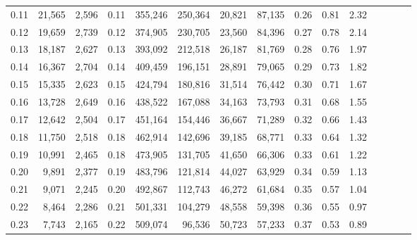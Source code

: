 \begin{tabular}{rrrcrrrrrrrrrrr}
0.11 &  21,565 &  2,596 &                                       0.11 &  355,246 &  250,364 &   20,821 &   87,135 &  0.26 &  0.81 &                         2.32 \\
0.12 &  19,659 &  2,739 &                                       0.12 &  374,905 &  230,705 &   23,560 &   84,396 &  0.27 &  0.78 &                         2.14 \\
0.13 &  18,187 &  2,627 &                                       0.13 &  393,092 &  212,518 &   26,187 &   81,769 &  0.28 &  0.76 &                         1.97 \\
0.14 &  16,367 &  2,704 &                                       0.14 &  409,459 &  196,151 &   28,891 &   79,065 &  0.29 &  0.73 &                         1.82 \\
0.15 &  15,335 &  2,623 &                                       0.15 &  424,794 &  180,816 &   31,514 &   76,442 &  0.30 &  0.71 &                         1.67 \\
0.16 &  13,728 &  2,649 &                                       0.16 &  438,522 &  167,088 &   34,163 &   73,793 &  0.31 &  0.68 &                         1.55 \\
0.17 &  12,642 &  2,504 &                                       0.17 &  451,164 &  154,446 &   36,667 &   71,289 &  0.32 &  0.66 &                         1.43 \\
0.18 &  11,750 &  2,518 &                                       0.18 &  462,914 &  142,696 &   39,185 &   68,771 &  0.33 &  0.64 &                         1.32 \\
0.19 &  10,991 &  2,465 &                                       0.18 &  473,905 &  131,705 &   41,650 &   66,306 &  0.33 &  0.61 &                         1.22 \\
0.20 &   9,891 &  2,377 &                                       0.19 &  483,796 &  121,814 &   44,027 &   63,929 &  0.34 &  0.59 &                         1.13 \\
0.21 &   9,071 &  2,245 &                                       0.20 &  492,867 &  112,743 &   46,272 &   61,684 &  0.35 &  0.57 &                         1.04 \\
0.22 &   8,464 &  2,286 &                                       0.21 &  501,331 &  104,279 &   48,558 &   59,398 &  0.36 &  0.55 &                         0.97 \\
0.23 &   7,743 &  2,165 &                                       0.22 &  509,074 &   96,536 &   50,723 &   57,233 &  0.37 &  0.53 &                         0.89 \\

\end{tabular}
